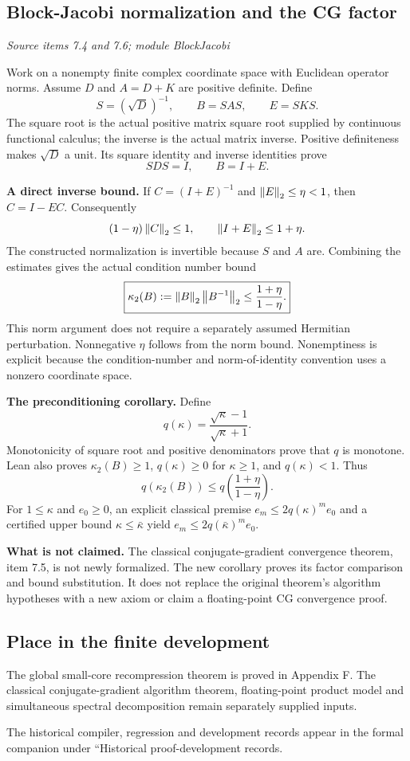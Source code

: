 \subsection{Block-Jacobi normalization and the CG factor}\label{supp5:subsection:006}\textit{Source items 7.4 and 7.6; module BlockJacobi}\par
Work on a nonempty finite complex coordinate space with Euclidean operator norms. Assume $D$ and $A=D+K$ are positive definite. Define
\[
S=(\sqrt D)^{-1},\qquad B=SAS,\qquad E=SKS.
\]
The square root is the actual positive matrix square root supplied by continuous functional calculus; the inverse is the actual matrix inverse. Positive definiteness makes $\sqrt D$ a unit. Its square identity and inverse identities prove
\[
SDS=I,\qquad B=I+E.
\]

\textbf{A direct inverse bound.} If $C=(I+E)^{-1}$ and $\left\lVert E\right\rVert_2\leq\eta<1$, then $C=I-EC$. Consequently
\[
(1-\eta)\left\lVert C\right\rVert_2\leq 1,
\qquad \left\lVert I+E\right\rVert_2\leq 1+\eta.
\]
The constructed normalization is invertible because $S$ and $A$ are. Combining the estimates gives the actual condition number bound
\[
\boxed{\kappa_2(B):=\left\lVert B\right\rVert_2\left\lVert B^{-1}\right\rVert_2
\leq\frac{1+\eta}{1-\eta}.}
\]
This norm argument does not require a separately assumed Hermitian perturbation. Nonnegative $\eta$ follows from the norm bound. Nonemptiness is explicit because the condition-number and norm-of-identity convention uses a nonzero coordinate space.

\textbf{The preconditioning corollary.} Define
\[
q(\kappa)=\frac{\sqrt\kappa-1}{\sqrt\kappa+1}.
\]
Monotonicity of square root and positive denominators prove that $q$ is monotone. Lean also proves $\kappa_2(B)\geq1$, $q(\kappa)\geq0$ for $\kappa\geq1$, and $q(\kappa)<1$. Thus
\[
\boxed{q(\kappa_2(B))\leq q\!\left(\frac{1+\eta}{1-\eta}\right).}
\]
For $1\leq\kappa$ and $e_0\geq0$, an explicit classical premise $e_m\leq2q(\kappa)^m e_0$ and a certified upper bound $\kappa\leq\bar\kappa$ yield $e_m\leq2q(\bar\kappa)^m e_0$.

\textbf{What is not claimed.} The classical conjugate-gradient convergence theorem, item 7.5, is not newly formalized. The new corollary proves its factor comparison and bound substitution. It does not replace the original theorem's algorithm hypotheses with a new axiom or claim a floating-point CG convergence proof.



\subsection{Place in the finite development}\label{supp5:subsection:007}
The global small-core recompression theorem is proved in Appendix F. The classical conjugate-gradient algorithm theorem, floating-point product model and simultaneous spectral decomposition remain separately supplied inputs.

The historical compiler, regression and development records appear in the formal companion under ``Historical proof-development records.
